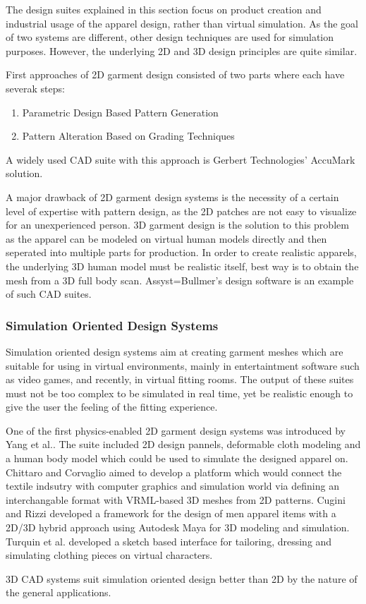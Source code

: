   The design suites explained in this section focus on product creation and industrial usage of the apparel design, rather than virtual simulation. 
  As the goal of two systems are different, other design techniques are used for simulation purposes. However, the underlying 2D and 3D design principles 
  are quite similar.
  
  First approaches of 2D garment design consisted of two parts where each have severak steps\cite{Yang2007}:  
 
 \begin{enumerate}
\item Parametric Design Based Pattern Generation
\item Pattern Alteration Based on Grading Techniques
\end{enumerate}    
 
 A widely used CAD suite with this approach is Gerbert Technologies' AccuMark solution\cite{Gerbert2013}. 
 
 A major drawback of 2D garment design systems is the necessity of a certain level of expertise with pattern design, as the 2D patches are not easy to visualize 
 for an unexperienced person. 3D garment design is the solution to this problem as the apparel can be modeled on virtual human models directly and then seperated 
 into multiple parts for production. In order to create realistic apparels, the underlying 3D human model must be realistic itself, best way is to obtain the mesh 
 from a 3D full body scan. Assyst=Bullmer's design software is an example of such CAD suites\cite{Assyst2013}. 
 
\subsubsection{Simulation Oriented Design Systems} 
 
 Simulation oriented design systems aim at creating garment meshes which are suitable for using in virtual environments, mainly in entertaintment software such 
 as video games, and recently, in virtual fitting rooms. The output of these suites must not be too complex to be simulated in real time, yet be realistic enough
 to give the user the feeling of the fitting experience.
 
 One of the first physics-enabled 2D garment design systems was introduced by Yang et al.\cite{Yang1992}. The suite included 2D design pannels, deformable cloth modeling and
 a human body model which could be used to simulate the designed apparel on. Chittaro and Corvaglio\cite{Chittaro2003} aimed to develop a platform which would connect
 the textile indsutry with computer graphics and simulation world via defining an interchangable format with VRML-based 3D meshes from 2D patterns.  Cugini and Rizzi
 developed a framework\cite{Cugini2002} for the design of men apparel items with a 2D/3D hybrid approach using Autodesk Maya\cite{Autodesk2013} for 3D modeling and simulation.
 Turquin et al. developed a sketch based interface for tailoring, dressing and simulating clothing pieces on virtual characters\cite{Turquin2007}.
 
 3D CAD systems suit simulation oriented design better than 2D by the nature of the general applications. 
 
   